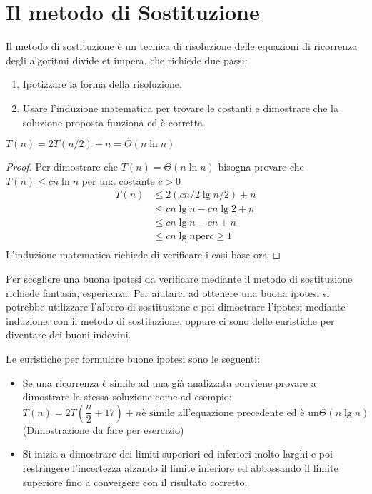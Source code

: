 \section{Il metodo di Sostituzione}
Il metodo di sostituzione è un tecnica di risoluzione delle equazioni di ricorrenza
degli algoritmi divide et impera, che richiede due passi:
\begin{enumerate}
    \item Ipotizzare la forma della risoluzione.
    \item Usare l'induzione matematica per trovare le costanti e dimostrare che
          la soluzione proposta funziona ed è corretta.
\end{enumerate}

\begin{thm}
    $T(n) = 2T(n/2) + n = \Theta(n \ln n)$
\end{thm}
\begin{proof}
Per dimostrare che $T(n) = \Theta(n \ln n)$ bisogna provare che $T(n) \leq cn \ln n$ per una costante $c > 0$
\begin{equation*}
\begin{align*}
T(n) & \leq 2(cn/2 \lg n/2) + n \\
     & \leq cn \lg n - cn \lg 2 + n\\
     & \leq cn \lg n - cn + n \\
     & \leq cn \lg n \text{per} c \geq 1\\
\end{align*}
\end{equation*}
L'induzione matematica richiede di verificare i casi base ora
\end{proof}

Per scegliere una buona ipotesi da verificare mediante il metodo di sostituzione
richiede fantasia, esperienza.
Per aiutarci ad ottenere una buona ipotesi si potrebbe utilizzare l'albero di sostituzione
e poi dimostrare l'ipotesi mediante induzione, con il metodo di sostituzione, oppure
ci sono delle euristiche per diventare dei buoni indovini.

Le euristiche per formulare buone ipotesi sono le seguenti:
\begin{itemize}
    \item Se una ricorrenza è simile ad una già analizzata conviene provare a dimostrare
          la stessa soluzione come ad esempio:
          \begin{equation*}
              T(n) = 2T(\frac{n}{2} + 17) + n \text{è simile all'equazione precedente ed è un} \Theta(n \lg n)
          \end{equation*}
          (Dimostrazione da fare per esercizio)
    \item Si inizia a dimostrare dei limiti superiori ed inferiori molto larghi e
          poi restringere l'incertezza alzando il limite inferiore ed abbassando
          il limite superiore fino a convergere con il risultato corretto.
\end{itemize}

